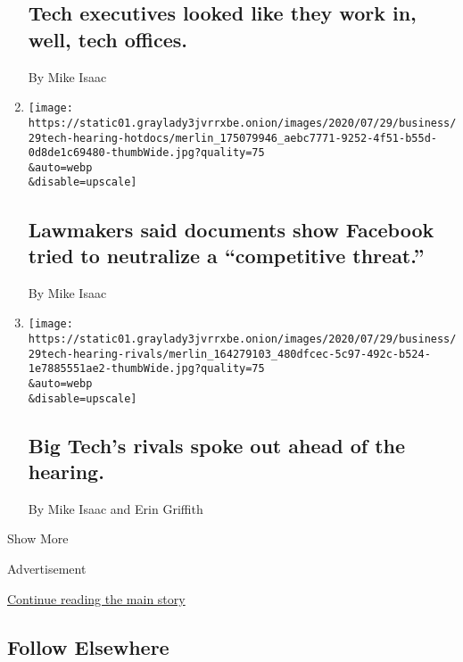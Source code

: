 \begin{enumerate}
{  \subsection{Tech executives looked like they work in, well, tech
  offices.}\label{tech-executives-looked-like-they-work-in-well-tech-offices}}

  By Mike Isaac
\item
  \href{/live/2020/07/29/technology/tech-ceos-hearing-testimony/lawmakers-said-documents-show-facebook-tried-to-neutralize-a-competitive-threat}{}

  \texttt{[image: https://static01.graylady3jvrrxbe.onion/images/2020/07/29/business/29tech-hearing-hotdocs/merlin\_175079946\_aebc7771-9252-4f51-b55d-0d8de1c69480-thumbWide.jpg?quality=75\\\&auto=webp\\\&disable=upscale]}

  \hypertarget{lawmakers-said-documents-show-facebook-tried-to-neutralize-a-competitive-threat}{%
  \subsection{Lawmakers said documents show Facebook tried to neutralize
  a ``competitive
  threat.''}\label{lawmakers-said-documents-show-facebook-tried-to-neutralize-a-competitive-threat}}

  By Mike Isaac
\item
  \href{/live/2020/07/29/technology/tech-ceos-hearing-testimony/big-techs-rivals-spoke-out-ahead-of-the-hearing}{}

  \texttt{[image: https://static01.graylady3jvrrxbe.onion/images/2020/07/29/business/29tech-hearing-rivals/merlin\_164279103\_480dfcec-5c97-492c-b524-1e7885551ae2-thumbWide.jpg?quality=75\\\&auto=webp\\\&disable=upscale]}

  \hypertarget{big-techs-rivals-spoke-out-ahead-of-the-hearing}{%
  \subsection{Big Tech's rivals spoke out ahead of the
  hearing.}\label{big-techs-rivals-spoke-out-ahead-of-the-hearing}}

  By Mike Isaac and Erin Griffith
\end{enumerate}

Show More

Advertisement

\protect\hyperlink{after-mid2}{Continue reading the main story}

\hypertarget{follow-elsewhere}{%
\subsection{Follow Elsewhere}\label{follow-elsewhere}}

